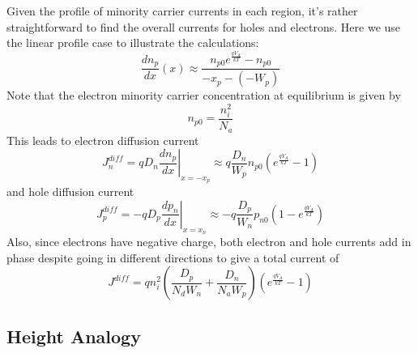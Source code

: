 Given the profile of minority carrier currents in each region, it's rather straightforward to find the overall currents for holes and electrons.  Here we use the linear profile case to illustrate the calculations:
%
\begin{equation}
	\frac{{d{n_p}}}{{dx}}(x) \approx \frac{{{n_{p0}}{e^{\frac{{q{V_A}}}{{kT}}}} - {n_{p0}}}}{{ - {x_p} - ( - {W_p})}}
\end{equation}
Note that the electron minority carrier concentration at equilibrium is given by
\begin{equation}
	{n_{p0}} = \frac{{n_i^2}}{{{N_a}}}
\end{equation}
This leads to electron diffusion current
\begin{equation}
	J_n^{diff} = q{D_n}{\left. {\frac{{d{n_p}}}{{dx}}} \right|_{x =  - {x_p}}} \approx q\frac{{{D_n}}}{{{W_p}}}{n_{p0}}\left( {{e^{\frac{{q{V_A}}}{{kT}}}} - 1} \right)
\end{equation}
%
and hole diffusion current
\begin{equation}
	J_p^{diff} =  - q{D_p}{\left. {\frac{{d{p_n}}}{{dx}}} \right|_{x = {x_n}}} \approx  - q\frac{{{D_p}}}{{{W_n}}}{p_{n0}}\left( {1 - {e^{\frac{{q{V_A}}}{{kT}}}}} \right)
\end{equation}
%
Also, since electrons have negative charge, both electron and hole currents add in phase despite going in different directions to give a total current of
\begin{equation}
	J_{}^{diff} = qn_i^2\left( {\frac{{{D_p}}}{{{N_d}{W_n}}} + \frac{{{D_n}}}{{{N_a}{W_p}}}} \right)\left( {{e^{\frac{{q{V_A}}}{{kT}}}} - 1} \right)
\end{equation}


\subsection{Height Analogy}

